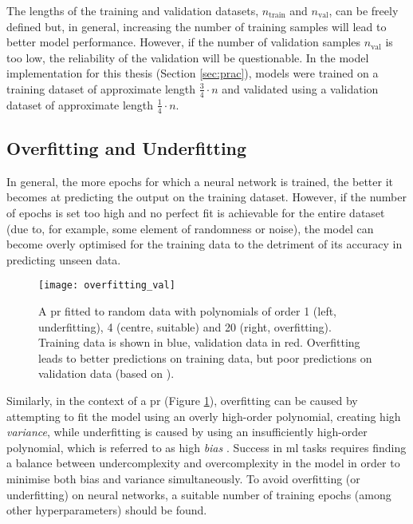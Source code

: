 The lengths of the training and validation datasets, \(n_{\text{train}}\) and \(n_{\text{val}}\), can be freely defined but, in general, increasing the number of training samples will lead to better model performance. However, if the number of validation samples \(n_{\text{val}}\) is too low, the reliability of the validation will be questionable. In the model implementation for this thesis (Section \ref{sec:prac}), models were trained on a training dataset of approximate length \(\frac{3}{4} \cdot n\) and validated using a validation dataset of approximate length \(\frac{1}{4} \cdot n\).

\subsection{Overfitting and Underfitting}
In general, the more epochs for which a neural network is trained, the better it becomes at predicting the output on the training dataset. However, if the number of epochs is set too high and no perfect fit is achievable for the entire dataset (due to, for example, some element of randomness or noise), the model can become overly optimised for the training data to the detriment of its accuracy in predicting unseen data.

\begin{figure}[tb!]
    \centering
    \texttt{[image: overfitting\_val]}
    \caption{\label{fig:overfitting} A \ac{pr} fitted to random data with polynomials of order 1 (left, underfitting), 4 (centre, suitable) and 20 (right, overfitting). Training data is shown in blue, validation data in red. Overfitting leads to better predictions on training data, but poor predictions on validation data (based on \protect\citet{vanderplas_python_2016}).}
\end{figure}

Similarly, in the context of a \ac{pr} (Figure \ref{fig:overfitting}), overfitting can be caused by attempting to fit the model using an overly high-order polynomial, creating high \textit{variance}, while underfitting is caused by using an insufficiently high-order polynomial, which is referred to as high \textit{bias} \cite[p. 365]{vanderplas_python_2016}. Success in \ac{ml} tasks requires finding a balance between undercomplexity and overcomplexity in the model in order to minimise both bias and variance simultaneously. To avoid overfitting (or underfitting) on neural networks, a suitable number of training epochs (among other hyperparameters) should be found.

